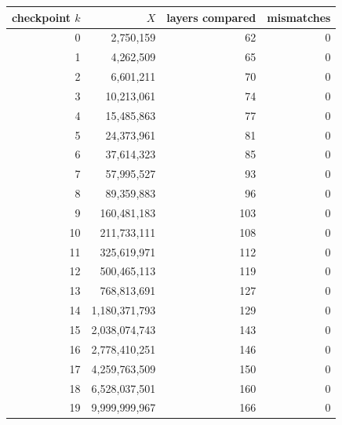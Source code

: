 \begin{tabular}{r r r r}
\toprule
checkpoint $k$ & $X$ & layers compared & mismatches \\
\midrule
0 & 2{,}750{,}159 & 62 & 0 \\
1 & 4{,}262{,}509 & 65 & 0 \\
2 & 6{,}601{,}211 & 70 & 0 \\
3 & 10{,}213{,}061 & 74 & 0 \\
4 & 15{,}485{,}863 & 77 & 0 \\
5 & 24{,}373{,}961 & 81 & 0 \\
6 & 37{,}614{,}323 & 85 & 0 \\
7 & 57{,}995{,}527 & 93 & 0 \\
8 & 89{,}359{,}883 & 96 & 0 \\
9 & 160{,}481{,}183 & 103 & 0 \\
10 & 211{,}733{,}111 & 108 & 0 \\
11 & 325{,}619{,}971 & 112 & 0 \\
12 & 500{,}465{,}113 & 119 & 0 \\
13 & 768{,}813{,}691 & 127 & 0 \\
14 & 1{,}180{,}371{,}793 & 129 & 0 \\
15 & 2{,}038{,}074{,}743 & 143 & 0 \\
16 & 2{,}778{,}410{,}251 & 146 & 0 \\
17 & 4{,}259{,}763{,}509 & 150 & 0 \\
18 & 6{,}528{,}037{,}501 & 160 & 0 \\
19 & 9{,}999{,}999{,}967 & 166 & 0 \\
\bottomrule
\end{tabular}